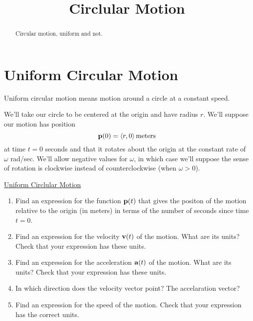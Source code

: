 \documentclass{ximera}
\title{Circlular Motion}
\begin{document}
\begin{abstract}
Circular motion, uniform and not.
\end{abstract}
\maketitle

\section{Uniform Circular Motion}
\begin{question}  \label{Q34trgr5t5t344}
Uniform circular motion means motion around a circle at a constant speed.

We'll take our circle to be centered at the origin and have radius $r$. We'll suppose our motion has position 
\[
     {\bf p}(0) = \langle r, 0 \rangle \, \text{meters}
\]
at time $t=0$ seconds and that it rotates about the origin at the constant rate of $\omega$ rad/sec. We'll allow negative values for $\omega$, in which case we'll suppose the sense of rotation is clockwise instead of counterclockwise (when $\omega > 0$). 

\begin{onlineOnly}
    \begin{center}
\end{center}
\end{onlineOnly}

\href{https://www.geogebra.org/classic/uu2jshcp}{Uniform Circlular Motion}

\begin{enumerate}
\item Find an expression for the function ${\bf p}(t)$ that gives the positon of the motion relative to the origin (in meters) in terms of the number of seconds since time $t=0$.

\item Find an expression for the velocity ${\bf v}(t)$ of the motion. What are its units? Check that your expression has these units.

\item Find an expression for the acceleration ${\bf a}(t)$ of the motion. What are its units? Check that your expression has these units.

\item In which direction does the velocity vector point? The accelaration vector?

\item Find an expression for the speed of the motion. Check that your expression has the correct units.


\end{enumerate}
\end{question}
\end{document}
